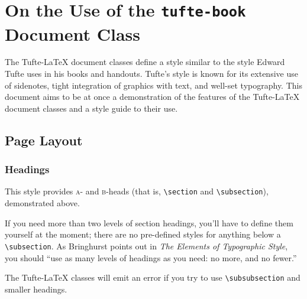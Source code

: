 \documentclass{tufte-book} %
\newcommand{\TL}{Tufte-\LaTeX\xspace}
\begin{document}

\chapter[On the Use of the tufte-book Document Class]{On the Use of the \texttt{tufte-book} Document Class}
\label{ch:tufte-book}

The \TL document classes define a style similar to the style Edward Tufte uses in his books and handouts. Tufte's style is known for its extensive use of sidenotes, tight integration of graphics with text, and well-set typography. This document aims to be at once a demonstration of the features of the \TL document classes and a style guide to their use.


\section{Page Layout}\label{sec:page-layout}
\subsection{Headings}\label{sec:headings}
This style provides \textsc{a}- and \textsc{b}-heads (that is, \Verb|\section| and \Verb|\subsection|), demonstrated above.

If you need more than two levels of section headings, you'll have to define them yourself at the moment; there are no pre-defined styles for anything below a \Verb|\subsection|. As Bringhurst points out in \textit{The Elements of Typographic Style},\cite{Bringhurst2005} you should ``use as many levels of headings as you need: no more, and no fewer.''

The \TL classes will emit an error if you try to use \linebreak\Verb|\subsubsection| and smaller headings.
\end{document}

